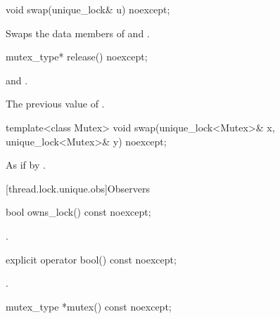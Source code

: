%
\begin{itemdecl}
void swap(unique_lock& u) noexcept;
\end{itemdecl}

\begin{itemdescr}
\pnum
\effects
Swaps the data members of  and .
\end{itemdescr}

%
\begin{itemdecl}
mutex_type* release() noexcept;
\end{itemdecl}

\begin{itemdescr}
\pnum
\ensures
{} and .

\pnum
\returns
The previous value of .
\end{itemdescr}

%
\begin{itemdecl}
template<class Mutex>
  void swap(unique_lock<Mutex>& x, unique_lock<Mutex>& y) noexcept;
\end{itemdecl}

\begin{itemdescr}
\pnum
\effects
As if by .
\end{itemdescr}

[thread.lock.unique.obs]{Observers}

%
\begin{itemdecl}
bool owns_lock() const noexcept;
\end{itemdecl}

\begin{itemdescr}
\pnum
\returns
{}.
\end{itemdescr}

%
\begin{itemdecl}
explicit operator bool() const noexcept;
\end{itemdecl}

\begin{itemdescr}
\pnum
\returns
{}.
\end{itemdescr}

%
\begin{itemdecl}
mutex_type *mutex() const noexcept;
\end{itemdecl}

